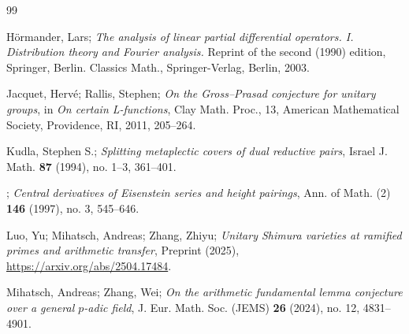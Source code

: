 \documentclass[reqno, 11pt]{amsart} %
\numberwithin{equation}{section}
\theoremstyle{plain}
\theoremstyle{definition}
\theoremstyle{remark}
\begin{document}
\begin{thebibliography}{99}
%

Hörmander, Lars; \emph{The analysis of linear partial differential operators. I. Distribution theory and Fourier analysis.} Reprint of the second (1990) edition, Springer, Berlin. Classics Math., Springer-Verlag, Berlin, 2003.

Jacquet, Hervé; Rallis, Stephen; \emph{On the Gross--Prasad conjecture for unitary groups}, in \emph{On certain L-functions}, Clay Math. Proc., 13, American Mathematical Society, Providence, RI, 2011, 205--264.


Kudla, Stephen S.; \emph{Splitting metaplectic covers of dual reductive pairs}, Israel J. Math. \textbf{87} (1994), no. 1--3, 361--401.

\bysame; \emph{Central derivatives of Eisenstein series and height pairings}, Ann. of Math. (2) \textbf{146} (1997), no. 3, 545--646.



Luo, Yu; Mihatsch, Andreas; Zhang, Zhiyu; \emph{Unitary Shimura varieties at ramified primes and arithmetic transfer}, Preprint (2025), \href{https://arxiv.org/abs/2504.17484}{https://arxiv.org/abs/2504.17484}.


Mihatsch, Andreas; Zhang, Wei; \emph{On the arithmetic fundamental lemma conjecture over a general $p$-adic field}, J. Eur. Math. Soc. (JEMS) \textbf{26} (2024), no. 12, 4831--4901.


\end{thebibliography}
\end{document}
